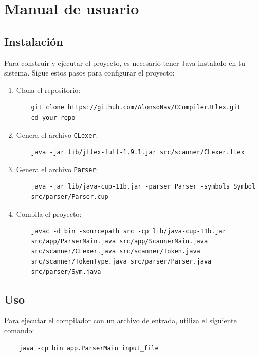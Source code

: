 \documentclass[a4paper,12pt]{article}
\begin{document}
\section*{Manual de usuario}
\subsection*{Instalación}
Para construir y ejecutar el proyecto, es necesario tener Java instalado en tu sistema. Sigue estos pasos para configurar el proyecto:

\begin{enumerate}
    \item Clona el repositorio:
    \begin{verbatim}
    git clone https://github.com/AlonsoNav/CCompilerJFlex.git
    cd your-repo
    \end{verbatim}

    \item Genera el archivo \texttt{CLexer}:
    \begin{verbatim}
    java -jar lib/jflex-full-1.9.1.jar src/scanner/CLexer.flex
    \end{verbatim}

	\item Genera el archivo \texttt{Parser}:
	\begin{verbatim}
	java -jar lib/java-cup-11b.jar -parser Parser -symbols Symbol 
	src/parser/Parser.cup
	\end{verbatim}

    \item Compila el proyecto:
    \begin{verbatim}
    javac -d bin -sourcepath src -cp lib/java-cup-11b.jar 
	src/app/ParserMain.java src/app/ScannerMain.java 
	src/scanner/CLexer.java src/scanner/Token.java 
	src/scanner/TokenType.java src/parser/Parser.java 
	src/parser/Sym.java
    \end{verbatim}
\end{enumerate}

\subsection*{Uso}
Para ejecutar el compilador con un archivo de entrada, utiliza el siguiente comando:
\begin{verbatim}
    java -cp bin app.ParserMain input_file
\end{verbatim}
\end{document}
